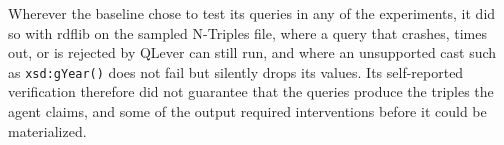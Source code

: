 Wherever the baseline chose to test its queries in any of the experiments, it did so with rdflib on the sampled N-Triples file, where a query that crashes, times out, or is rejected by QLever can still run, and where an unsupported cast such as \texttt{xsd:gYear()} does not fail but silently drops its values. Its self-reported verification therefore did not guarantee that the queries produce the triples the agent claims, and some of the output required interventions before it could be materialized.


